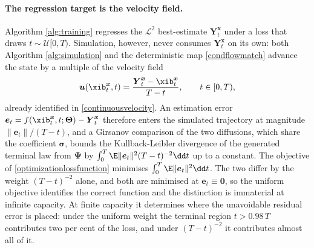 \paragraph{The regression target is the velocity field.}
Algorithm \ref{alg:training} regresses the $\mathcal{L}^2$ best-estimate
$\boldsymbol{Y}^{\boldsymbol{x}}_t$ under a loss that draws
$t\sim\mathcal{U}[0,T)$. Simulation, however, never consumes
$\boldsymbol{Y}^{\boldsymbol{x}}_t$ on its own: both Algorithm
\ref{alg:simulation} and the deterministic map \eqref{condflowmatch} advance the
state by a multiple of the velocity field
\begin{align}
\boldsymbol{u}(\xib^{\boldsymbol{x}}_t,t)
= \frac{\boldsymbol{Y}^{\boldsymbol{x}}_t - \xib^{\boldsymbol{x}}_t}{T-t},
\qquad t\in[0,T),
\label{eq:velocityrepeat}
\end{align}
already identified in \eqref{continuousvelocity}. An estimation error
$\boldsymbol{e}_t = f(\xib^{\boldsymbol{x}}_t,t;\boldsymbol{\Theta}) -
\boldsymbol{Y}^{\boldsymbol{x}}_t$ therefore enters the simulated trajectory at
magnitude $\|\boldsymbol{e}_t\|/(T-t)$, and a Girsanov comparison of the two
diffusions, which share the coefficient $\boldsymbol{\sigma}$, bounds the
Kullback-Leibler divergence of the generated terminal law from $\boldsymbol{\Psi}$
by $\int_0^T \E\|\boldsymbol{e}_t\|^2 (T-t)^{-2}\dd t$ up to a constant. The
objective of \eqref{optimizationlossfunction} minimises
$\int_0^T\E\|\boldsymbol{e}_t\|^2\dd t$. The two differ by the weight
$(T-t)^{-2}$ alone, and both are minimised at $\boldsymbol{e}_t\equiv\boldsymbol{0}$,
so the uniform objective identifies the correct function and the distinction is
immaterial at infinite capacity. At finite capacity it determines where the
unavoidable residual error is placed: under the uniform weight the terminal
region $t>0.98\,T$ contributes two per cent of the loss, and under $(T-t)^{-2}$
it contributes almost all of it.

